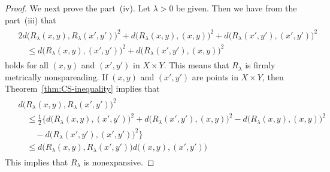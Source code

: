 \documentclass[draft]{amsart}
\numberwithin{equation}{section}
\theoremstyle{plain}
\theoremstyle{definition}
\theoremstyle{remark}
\begin{document}
\begin{proof}
 We next prove the part~(iv). Let $\lambda>0$ be given. 
 Then we have from the part~(iii) that 
 \begin{align}
 \begin{split}
  &2d\bigl(R_{\lambda}(x,y), R_{\lambda}(x',y')\bigr)^2
 +d\bigl(R_{\lambda}(x,y), (x,y)\bigr)^2 
 +d\bigl(R_{\lambda}(x',y'), (x',y')\bigr)^2 \\
  &\quad \leq d\bigl(R_{\lambda}(x,y), (x',y')\bigr)^2
+ d\bigl(R_{\lambda}(x',y'), (x,y)\bigr)^2  
 \end{split}
 \end{align}
  holds for all $(x,y)$ and $(x',y')$ in $X\times Y$. 
 This means that $R_{\lambda}$ is firmly metrically nonspareading. 
 If $(x,y)$ and $(x',y')$ are points in $X\times Y$, 
 then Theorem~\ref{thm:CS-inequality} implies that 
  \begin{align}
 \begin{split}
  &d\bigl(R_{\lambda}(x,y), R_{\lambda}(x',y')\bigr)^2 \\
  &\quad \leq \frac{1}{2}\bigl\{d\bigl(R_{\lambda}(x,y), (x',y')\bigr)^2
+ d\bigl(R_{\lambda}(x',y'), (x,y)\bigr)^2
 -d\bigl(R_{\lambda}(x,y), (x,y)\bigr)^2 \\
 &\qquad -d\bigl(R_{\lambda}(x',y'), (x',y')\bigr)^2\bigr\} \\
 &\quad \leq d\bigl(R_{\lambda}(x,y), R_{\lambda}(x',y')\bigr)
d\bigl((x,y), (x',y')\bigr)  
 \end{split}
 \end{align}
 This implies that $R_{\lambda}$ is nonexpansive. 


\end{proof}
\end{document}
